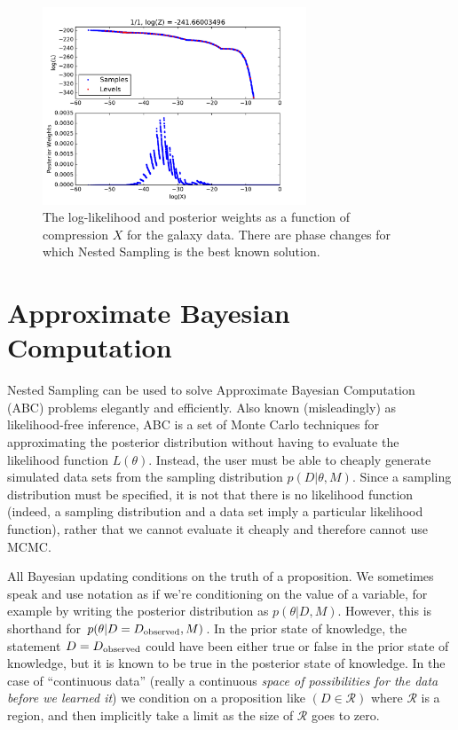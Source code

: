\documentclass[article]{jss}
\begin{document}
\begin{figure}[ht!]
\centering
\includegraphics[width=0.7\textwidth]{figures/galaxies_fig3.pdf}
\caption{The log-likelihood and posterior weights as a function
of compression $X$ for the galaxy data. There are phase changes
\citep{skilling} for which Nested Sampling is the best known
solution.
\label{fig:galaxies_fig3}}
\end{figure}


\section{Approximate Bayesian Computation}
Nested Sampling can be used to solve Approximate Bayesian Computation (ABC)
problems elegantly and efficiently.
Also known (misleadingly) as likelihood-free inference,
ABC
is a set of Monte Carlo techniques for approximating the posterior distribution
without having to evaluate the likelihood function $L(\theta)$. Instead, 
the user must be able to cheaply
generate simulated data sets from the sampling distribution $p(D|\theta, M)$.
Since a sampling distribution must be specified, it is not that there is
no likelihood function (indeed, a sampling distribution and
a data set imply a particular likelihood function), rather that we cannot
evaluate it cheaply and therefore cannot use MCMC.

All Bayesian updating conditions on the truth of a proposition. We sometimes
speak and use notation as if we're conditioning on the value of a variable, for
example by writing the posterior distribution as
$p(\theta | D, M)$. However,
this is shorthand for $p(\theta | D = D_{\rm observed}, M)$.
In the prior state of knowledge, the statement
$D = D_{\rm observed}$ could have been either
true or false in the prior state of knowledge, but it is known to be true
in the posterior state of knowledge.
In the case of ``continuous data'' (really a continuous {\it space of
possibilities for the data before we learned it}) we condition on a
proposition like $(D \in \mathcal{R})$ where $\mathcal{R}$ is a region, and
then implicitly take a limit as the size of $\mathcal{R}$ goes to zero.
\end{document}
